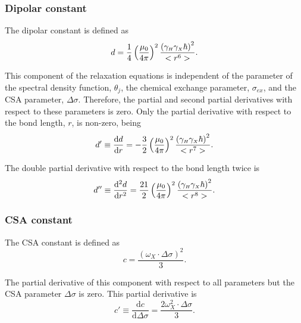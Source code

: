 \subsubsection{Dipolar constant}

The dipolar constant is defined as
\begin{equation}
    d = \frac{1}{4} \left(\frac{\mu_0}{4\pi}\right)^2 \frac{\left( \gamma_{\scriptscriptstyle H} \gamma_{\scriptscriptstyle X} \hbar \right)^2}{<r^6>}. \label{eq: Ri': d}
\end{equation}

\noindent This component of the relaxation equations is independent of the parameter of the spectral density function, $\theta_j$, the chemical exchange parameter, $\sigma_{ex}$, and the CSA parameter, $\Delta\sigma$.  Therefore, the partial and second partial derivatives with respect to these parameters is zero.  Only the partial derivative with respect to the bond length, $r$, is non-zero, being
\begin{equation}
    d' \equiv \frac{\mathrm{d} d}{\mathrm{d} r} = - \frac{3}{2} \left(\frac{\mu_0}{4\pi}\right)^2 \frac{\left( \gamma_{\scriptscriptstyle H} \gamma_{\scriptscriptstyle X} \hbar \right)^2}{<r^7>}. \label{eq: Ri': d'}
\end{equation}

\noindent The double partial derivative with respect to the bond length twice is
\begin{equation}
    d'' \equiv \frac{\mathrm{d}^2 d}{\mathrm{d} r^2} = \frac{21}{2} \left(\frac{\mu_0}{4\pi}\right)^2 \frac{\left( \gamma_{\scriptscriptstyle H} \gamma_{\scriptscriptstyle X} \hbar \right)^2}{<r^8>}. \label{eq: Ri': d"}
\end{equation}


\subsubsection{CSA constant}

The CSA constant is defined as
\begin{equation}
    c = \frac{\left(\omega_X \cdot \Delta\sigma \right)^2}{3}. \label{eq: Ri': c}
\end{equation}

\noindent The partial derivative of this component with respect to all parameters but the CSA parameter $\Delta\sigma$ is zero.  This partial derivative is
\begin{equation}
    c' \equiv \frac{\mathrm{d} c}{\mathrm{d} \Delta\sigma} = \frac{2 \omega_X^2 \cdot \Delta\sigma}{3}. \label{eq: Ri': c'}
\end{equation}

